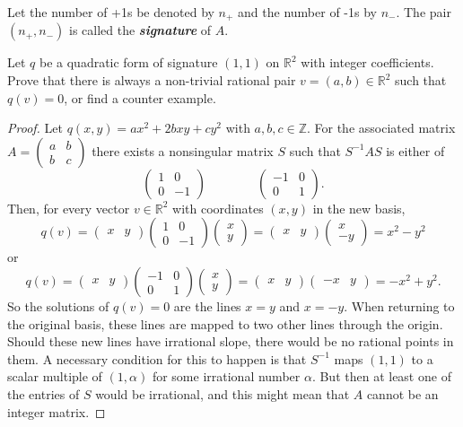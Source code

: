 \documentclass{article}
\numberwithin{equation}{section}
\newcommand{\R}{\mathbb{R}}
\newcommand{\Z}{\mathbb{Z}}
\begin{document}
\begin{defn}
	Let the number of +1s be denoted by $n_+$ and the number of -1s by $n_-$. The pair $(n_+,n_-)$ is called the \textbf{\textit{signature}} of $A$.
\end{defn}
\begin{exercise}
	Let $q$ be a quadratic form of signature $(1,1)$ on $\R^2$ with integer coefficients. Prove that there is always a non-trivial rational pair $v=(a,b)\in\R^2$ such that $q(v)=0$, or find a counter example.
\end{exercise}
\begin{proof}
	Let $q(x,y)=ax^2+2bxy+cy^2$ with $a,b,c\in\Z$. For the associated matrix $A=\begin{pmatrix}a&b\\b&c\end{pmatrix}$ there exists a nonsingular matrix $S$ such that $S^{-1}AS$ is either of
	\[\begin{pmatrix}
		1&0\\
		0&-1
	\end{pmatrix}\qquad\qquad\begin{pmatrix}
	-1&0\\
	0&1
	\end{pmatrix}.\]
	Then, for every vector $v\in\R^2$ with coordinates $(x,y)$ in the new basis,
	\[q(v)=\begin{pmatrix}
		x&y
	\end{pmatrix}\begin{pmatrix}
		1&0\\
		0&-1
	\end{pmatrix}\begin{pmatrix}
	x\\y
	\end{pmatrix}=
	\begin{pmatrix}
		x&y
	\end{pmatrix}
	\begin{pmatrix}
		x\\-y
	\end{pmatrix}=x^2-y^2\]
	or
	\[q(v)=\begin{pmatrix}
		x&y
	\end{pmatrix}\begin{pmatrix}
		-1&0\\
		0&1
	\end{pmatrix}\begin{pmatrix}
		x\\y
	\end{pmatrix}=
	\begin{pmatrix}
		x&y
	\end{pmatrix}
	\begin{pmatrix}
		-x&y
	\end{pmatrix}=-x^2+y^2.\]
	So the solutions of $q(v)=0$ are the lines $x=y$ and $x=-y$. When returning to the original basis, these lines are mapped to two other lines through the origin. Should these new lines have irrational slope, there would be no rational points in them. A necessary condition for this to happen is that $S^{-1}$ maps $(1,1)$ to a scalar multiple of $(1,\alpha)$ for some irrational number $\alpha$. But then at least one of the entries of $S$ would be irrational, and this {\color{magenta}might mean} that $A$ cannot be an integer matrix.
\end{proof}
\end{document}
